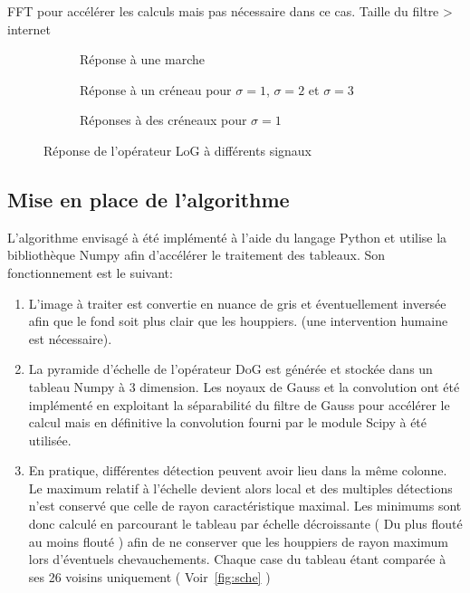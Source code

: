 \documentclass{article}
\begin{document}
	FFT pour accélérer les calculs mais pas nécessaire dans ce cas. Taille du filtre > internet



\begin{figure}
	\begin{subfigure}{.5\textwidth}
		\scalebox{0.3}{}
		\caption{Réponse à une marche}
	\end{subfigure}
	\begin{subfigure}{.5\textwidth}
		\scalebox{0.3}{}
		\caption{Réponse à un créneau pour $\sigma=1$, $\sigma=2$ et $\sigma=3$ }
	\end{subfigure}
	\begin{subfigure}{.5\textwidth}
		\scalebox{0.3}{}
		\caption{Réponses à des créneaux pour $\sigma=1$}
	\end{subfigure}
	\caption{Réponse de l'opérateur LoG à différents signaux}
	\label{fig:graph}
\end{figure}


	\subsection{Mise en place de l'algorithme}



	L'algorithme envisagé à été implémenté à l'aide du langage Python et utilise la bibliothèque Numpy afin d'accélérer le traitement des tableaux. Son fonctionnement est le suivant:

	\begin{enumerate}
	\item L'image à traiter est convertie en nuance de gris et éventuellement inversée afin que le fond soit plus clair que les houppiers. (une intervention humaine est nécessaire). 
	\item La pyramide d'échelle de l'opérateur DoG est générée et stockée dans un tableau Numpy à 3 dimension. Les noyaux de Gauss et la convolution ont été implémenté en exploitant la séparabilité du filtre de Gauss pour accélérer le calcul mais en définitive la convolution fourni par le module Scipy à été utilisée.  
	\item En pratique, différentes détection peuvent avoir lieu dans la même colonne. Le maximum relatif à l'échelle devient alors local et des multiples détections n'est conservé que celle de rayon caractéristique maximal. 
	Les minimums sont donc calculé en parcourant le tableau par échelle décroissante ( Du plus flouté au moins flouté ) afin de ne conserver que les houppiers de rayon maximum lors d'éventuels chevauchements. Chaque case du tableau étant comparée à ses 26 voisins uniquement ( Voir~\ref{fig:sche} ) 
	\end{enumerate}
\end{document}
